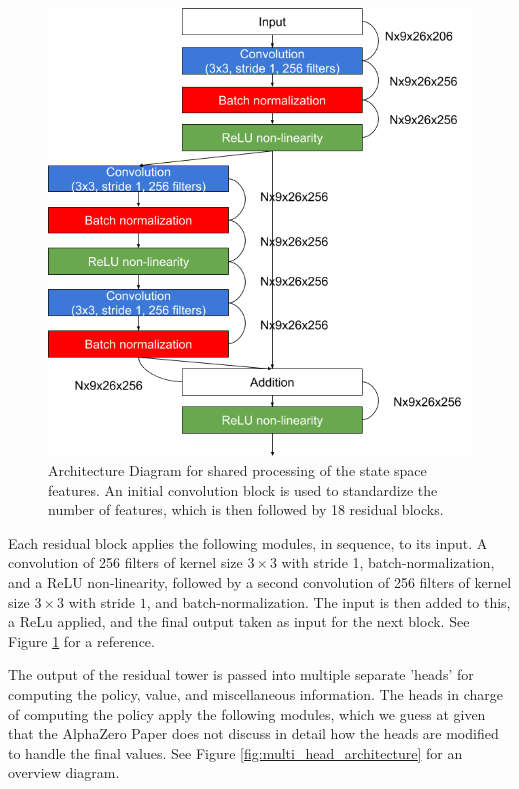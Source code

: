 \documentclass[10pt,twocolumn,letterpaper]{article}
\begin{document}
\begin{figure}[!ht]
    \centering
    \includegraphics[scale=0.3]{figures/architecture}
    \caption{Architecture Diagram for shared processing of the state space features. An initial convolution block is used to standardize the number of features, which is then followed by 18 residual blocks.}
    \label{fig:input_architecture_diagram}
\end{figure}

Each residual block applies the following modules, in sequence, to its input. A convolution of 256 filters of kernel size $3 \times 3$ with stride 1, batch-normalization, and a ReLU non-linearity, followed by a second convolution of 256 filters of kernel size $3 \times 3$ with stride $1$, and batch-normalization. The input is then added to this, a ReLu applied, and the final output taken as input for the next block. See Figure \ref{fig:input_architecture_diagram} for a reference.

The output of the residual tower is passed into multiple separate 'heads' for computing the policy, value, and miscellaneous information. The heads in charge of computing the policy apply the following modules, which we guess at given that the AlphaZero Paper \cite{AlphaZero} does not discuss in detail how the heads are modified to handle the final values. See Figure \ref{fig:multi_head_architecture} for an overview diagram.
\end{document}
